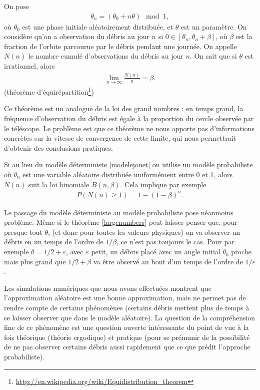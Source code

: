 \documentclass[a4paper,11pt]{article}
\newcommand{\eps}{\varepsilon}
\numberwithin{section}{part}
\begin{document}
%   
%   
  

On pose
\begin{align}
  \label{modelejouet}
  \theta_{n} = (\theta_{0} + n \theta) \mod 1,
\end{align}
où $\theta_{0}$ est une phase initiale aléatoirement distribuée, et
$\theta$ est un paramètre. On considère qu'on a observation du débris
au jour $n$ si $0 \in [\theta_{n}, \theta_{n}+\beta]$, où $\beta$ est
la fraction de l'orbite parcourue par le débris pendant une
journée. On appelle $N(n)$ le nombre cumulé d'observations du débris
au jour $n$. On sait que si $\theta$ est irrationnel, alors
\begin{align}
  \label{largenumbers}
  \lim_{n\to\infty} \frac{N(n)} n = \beta.
\end{align}
(théorème d'équirépartition\footnote{\url{http://en.wikipedia.org/wiki/Equidistribution_theorem}})

Ce théorème est un analogue de la loi des grand nombres : en temps
grand, la fréquence d'observation du débris est égale à la proportion
du cercle observée par le téléscope. Le problème est que ce théorème
ne nous apporte pas d'informations concrètes sur la vitesse de
convergence de cette limite, qui nous permettrait d'obtenir des
conclusions pratiques. 

Si au lieu du modèle déterministe \eqref{modelejouet} on utilise un
modèle probabiliste où $\theta_{n}$ est une variable aléatoire
distribuée uniformément entre 0 et 1, alors $N(n)$ suit la loi
binomiale $B(n,\beta)$. Cela implique par exemple
\begin{align}
  P(N(n) \geq 1) = 1 - (1-\beta)^{n}.
\end{align}

Le passage du modèle déterministe au modèle probabiliste pose
néanmoins problème. Même si le théorème \eqref{largenumbers} peut
laisser penser que, pour presque tout $\theta$, (et donc pour toutes
les valeurs physiques) on va observer un débris en un temps de l'ordre
de $1/\beta$, ce n'est pas toujours le cas. Pour par exemple $\theta =
1/2 + \eps$, avec $\eps$ petit, un débris placé avec un angle initial
$\theta_{0}$ proche mais plus grand que $1/2 + \beta$ va être observé
au bout d'un temps de l'ordre de $1/\eps$.

Les simulations numériques que nous avons effectuées montrent que
l'approximation aléatoire est une bonne approximation, mais ne permet
pas de rendre compte de certains phénomènes (certains débris mettent
plus de temps à se laisser observer que dans le modèle aléatoire). La
question de la compréhension fine de ce phénomène est une question
ouverte intéressante du point de vue à la fois théorique (théorie
ergodique) et pratique (pour se prémunir de la possibilité de ne pas
observer certains débris aussi rapidement que ce que prédit l'approche
probabiliste).
\end{document}
